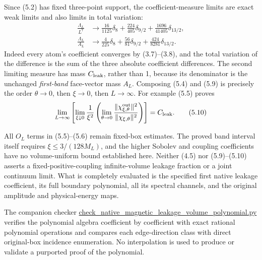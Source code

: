 \documentclass[
  11pt,
]{article}
\begin{document}
Since (5.2) has fixed three-point support, the coefficient-measure
limits are exact weak limits and also limits in total variation: \[
\boxed{\begin{split}
 \frac{\Lambda_L}{L^7}&\longrightarrow
  \frac{16}{1125}\delta_8+\frac{224}{405}\delta_{9/2}
                         +\frac{1696}{41405}\delta_{13/2},\\
 \frac{\Lambda_L}{A_L}&\longrightarrow
  \frac4{225}\delta_8+\frac{56}{81}\delta_{9/2}
                         +\frac{424}{8281}\delta_{13/2}.
\end{split}}
\tag{5.9}
\] Indeed every atom's coefficient converges by (3.7)--(3.8), and the
total variation of the difference is the sum of the three absolute
coefficient differences. The second limiting measure has mass
\(C_{\rm leak}\), rather than 1, because its denominator is the
unchanged \emph{first-band} face-vector mass \(A_L\). Composing (5.4)
and (5.9) is precisely the order \(\theta\to0\), then \(\xi\to0\), then
\(L\to\infty\). For example (5.5) proves \[
 \lim_{L\to\infty}\left[
 \lim_{\xi\downarrow0}\frac1{\xi^2}
  \left(\lim_{\theta\to0}
     \frac{\|\chi^{\rm out}_{\xi,\theta}\|^2}{\|\chi_{\xi,\theta}\|^2}
  \right)\right]=C_{\rm leak}.
\tag{5.10}
\]

All \(O_L\) terms in (5.5)--(5.6) remain fixed-box estimates. The proved
band interval itself requires \(\xi\le3/(128M_L)\), and the higher
Sobolev and coupling coefficients have no volume-uniform bound
established here. Neither (4.5) nor (5.9)--(5.10) asserts a
fixed-positive-coupling infinite-volume leakage fraction or a joint
continuum limit. What is completely evaluated is the specified first
native leakage coefficient, its full boundary polynomial, all its
spectral channels, and the original amplitude and physical-energy maps.

The companion checker
\url{check_native_magnetic_leakage_volume_polynomial.py} verifies the
polynomial algebra coefficient by coefficient with exact rational
polynomial operations and compares each edge-direction class with direct
original-box incidence enumeration. No interpolation is used to produce
or validate a purported proof of the polynomial.
\end{document}
